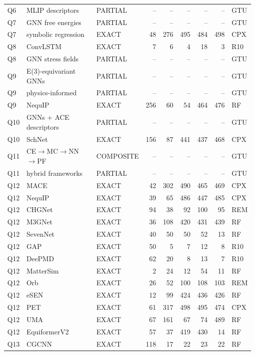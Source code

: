 \documentclass[11pt,a4paper]{article}
\begin{document}
{\begin{longtable}{@{}lp{3.0cm}lrrrrrl@{}}
Q6 & MLIP descriptors & PARTIAL & -- & -- & -- & -- & -- & GTU \\
Q7 & GNN free energies & PARTIAL & -- & -- & -- & -- & -- & GTU \\
Q7 & symbolic regression & EXACT & 48 & 276 & 495 & 484 & 498 & CPX \\
Q8 & ConvLSTM & EXACT & 7 & 6 & 4 & 18 & 3 & R10 \\
Q8 & GNN stress fields & PARTIAL & -- & -- & -- & -- & -- & GTU \\
Q9 & E(3)-equivariant GNNs & PARTIAL & -- & -- & -- & -- & -- & GTU \\
Q9 & physics-informed & PARTIAL & -- & -- & -- & -- & -- & GTU \\
Q9 & NequIP & EXACT & 256 & 60 & 54 & 464 & 476 & RF \\
Q10 & GNNs + ACE descriptors & PARTIAL & -- & -- & -- & -- & -- & GTU \\
Q10 & SchNet & EXACT & 156 & 87 & 441 & 437 & 468 & CPX \\
Q11 & CE$\to$MC$\to$NN$\to$PF & COMPOSITE & -- & -- & -- & -- & -- & GTU \\
Q11 & hybrid frameworks & PARTIAL & -- & -- & -- & -- & -- & GTU \\
Q12 & MACE & EXACT & 42 & 302 & 490 & 465 & 469 & CPX \\
Q12 & NequIP & EXACT & 39 & 65 & 486 & 447 & 485 & CPX \\
Q12 & CHGNet & EXACT & 94 & 38 & 92 & 100 & 95 & REM \\
Q12 & M3GNet & EXACT & 36 & 108 & 420 & 431 & 439 & RF \\
Q12 & SevenNet & EXACT & 40 & 50 & 50 & 52 & 13 & RF \\
Q12 & GAP & EXACT & 50 & 5 & 7 & 12 & 8 & R10 \\
Q12 & DeePMD & EXACT & 62 & 20 & 8 & 13 & 7 & R10 \\
Q12 & MatterSim & EXACT & 2 & 24 & 12 & 54 & 11 & RF \\
Q12 & Orb & EXACT & 26 & 52 & 100 & 108 & 103 & REM \\
Q12 & eSEN & EXACT & 12 & 99 & 424 & 436 & 426 & RF \\
Q12 & PET & EXACT & 61 & 317 & 498 & 495 & 474 & CPX \\
Q12 & UMA & EXACT & 67 & 161 & 67 & 74 & 489 & RF \\
Q12 & EquiformerV2 & EXACT & 57 & 37 & 419 & 430 & 14 & RF \\
Q13 & CGCNN & EXACT & 118 & 17 & 22 & 23 & 22 & RF \\

\end{longtable}}
\end{document}
